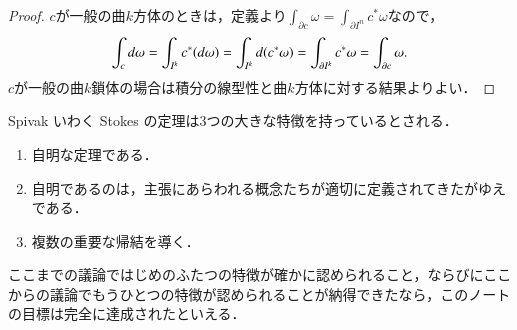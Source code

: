 \begin{proof}
$c$が一般の曲$k$方体のときは，定義より$\int_{\partial c} \omega = \int_{\partial I^n} c^* \omega$なので，
\begin{equation}
\int_c \mathop{}\!d \omega = \int_{I^k} c^* (\mathop{}\!d \omega) = \int_{I^k} \mathop{}\!d (c^* \omega) = \int_{\partial I^k} c^* \omega = \int_{\partial c} \omega.
\end{equation}$c$が一般の曲$k$鎖体の場合は積分の線型性と曲$k$方体に対する結果よりよい．
\end{proof}

Spivak いわく Stokes の定理は3つの大きな特徴を持っているとされる．
\begin{enumerate}
\item 自明な定理である．
\item 自明であるのは，主張にあらわれる概念たちが適切に定義されてきたがゆえである．
\item 複数の重要な帰結を導く．
\end{enumerate}
ここまでの議論ではじめのふたつの特徴が確かに認められること，ならびにここからの議論でもうひとつの特徴が認められることが納得できたなら，このノートの目標は完全に達成されたといえる．
